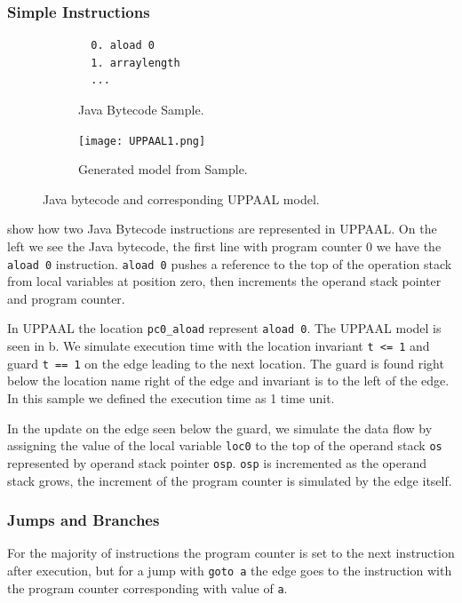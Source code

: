 \subsubsection{Simple Instructions}
\begin{figure}[H]
\centering
\begin{subfigure}{.3\textwidth}
  \begin{lstlisting}
  0. aload 0
  1. arraylength
  ...
  \end{lstlisting}
  \caption{Java Bytecode Sample.}
\end{subfigure} 
\hspace{10px}
\begin{subfigure}{.6\textwidth}
  \texttt{[image: UPPAAL1.png]}
  \caption{Generated model from Sample.}
\end{subfigure}
\caption{Java bytecode and corresponding UPPAAL model.}
\label{fig:uppaal1}
\end{figure}
 show how two Java Bytecode instructions are represented in UPPAAL. On the left we see the Java bytecode, the first line with program counter 0 we have the \texttt{aload 0} instruction. \texttt{aload 0} pushes a reference to the top of the operation stack from local variables at position zero, then increments the operand stack pointer and program counter.

In UPPAAL the location \texttt{pc0\_aload} represent \texttt{aload 0}. The UPPAAL model is seen in b. We simulate execution time with the location invariant \texttt{t <= 1}  and guard \texttt{t == 1} on the edge leading to the next location. The guard is found right below the location name right of the edge and invariant is to the left of the edge. In this sample we defined the execution time as 1 time unit.

In the update on the edge seen below the guard, we simulate the data flow by assigning the value of the local variable \texttt{loc0} to the top of the operand stack \texttt{os} represented by operand stack pointer \texttt{osp}. \texttt{osp} is incremented as the operand stack grows, the increment of the program counter is simulated by the edge itself.

\subsubsection{Jumps and Branches}
For the majority of instructions the program counter is set to the next instruction after execution, but for a jump with \texttt{goto a} the edge goes to the instruction with the program counter corresponding with value of \texttt{a}.

